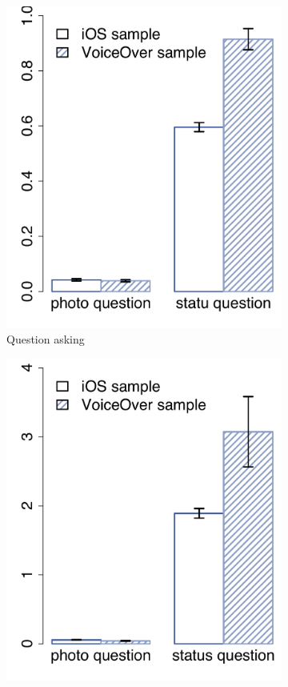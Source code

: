 \documentclass{sigchi}
\begin{document}
\begin{figure}
\centering
\begin{subfigure}[b]{0.23\textwidth}
    \includegraphics[width=\columnwidth]{question_ask.pdf}
    \caption{Question asking}
    \label{fig:question_ask}
 \end{subfigure}
\begin{subfigure}[b]{0.23\textwidth}
    \includegraphics[width=\columnwidth]{question_response.pdf}

\end{subfigure}
\end{figure}
\end{document}
